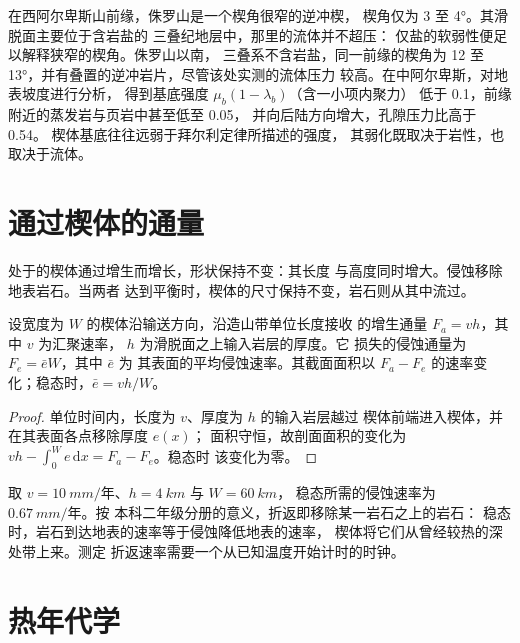 在西阿尔卑斯山前缘，侏罗山是一个楔角很窄的逆冲楔，
楔角仅为 3 至 \ang{4}。其滑脱面主要位于含岩盐的
三叠纪地层中，那里的流体并不超压：
仅盐的软弱性便足以解释狭窄的楔角。侏罗山以南，
三叠系不含岩盐，同一前缘的楔角为 12 至
\ang{13}，并有叠置的逆冲岩片，尽管该处实测的流体压力
较高。在中阿尔卑斯，对地表坡度进行分析，
得到基底强度 $\mu_b(1 - \lambda_b)$（含一小项内聚力）
低于 0.1，前缘附近的蒸发岩与页岩中甚至低至 0.05，
并向后陆方向增大，孔隙压力比高于 0.54。
楔体基底往往远弱于拜尔利定律所描述的强度，
其弱化既取决于岩性，也取决于流体。

\section{通过楔体的通量}\label{sec:b3:orogenic-wedges:flux}

处于的楔体通过增生而增长，形状保持不变：其长度
与高度同时增大。侵蚀移除地表岩石。当两者
达到平衡时，楔体的尺寸保持不变，岩石则从其中流过。

\begin{proposition}[稳态通量平衡]\label{prop:b3:orogenic-wedges:flux}
设宽度为 $W$ 的楔体沿输送方向，沿造山带单位长度接收
的增生通量 $F_a = v h$，其中 $v$ 为汇聚速率，
$h$ 为滑脱面之上输入岩层的厚度。它
损失的侵蚀通量为 $F_e = \bar e W$，其中 $\bar e$ 为
其表面的平均侵蚀速率。其截面面积以 $F_a -
F_e$ 的速率变化；稳态时，$\bar e = vh/W$。
\end{proposition}

\begin{proof}
单位时间内，长度为 $v$、厚度为 $h$ 的输入岩层越过
楔体前端进入楔体，并在其表面各点移除厚度 $e(x)$；
面积守恒，故剖面面积的变化为
$vh - \int_0^W e\,\mathrm dx = F_a - F_e$。稳态时
该变化为零。
\end{proof}

取 $v = \qty{10}{mm/\text{年}}$、$h = \qty{4}{km}$ 与 $W = \qty{60}{km}$，
稳态所需的侵蚀速率为 $\qty{0.67}{mm/\text{年}}$。按
本科二年级分册的意义，折返即移除某一岩石之上的岩石：
稳态时，岩石到达地表的速率等于侵蚀降低地表的速率，
楔体将它们从曾经较热的深处带上来。测定
折返速率需要一个从已知温度开始计时的时钟。

\section{热年代学}\label{sec:b3:orogenic-wedges:thermochronology}

